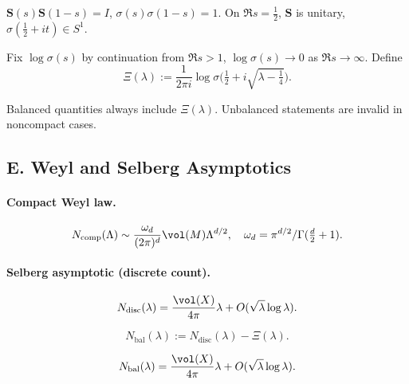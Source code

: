 \begin{lemma}
\label{lem:unitarity-part1}
$\mathbf S(s)\mathbf S(1-s)=I$, $\sigma(s)\sigma(1-s)=1$. On $\Re s=\tfrac12$, $\mathbf S$ is unitary, $\sigma(\tfrac12+it)\in S^1$.
\end{lemma}

\begin{definition}
\label{def:scattering-phase-part1}
Fix $\log\sigma(s)$ by continuation from $\Re s>1$, $\log\sigma(s)\to0$ as $\Re s\to\infty$. Define
\[
  \Xi(\lambda) := \frac{1}{2\pi i}\log \sigma\!\Big(\tfrac12+i\sqrt{\lambda-\tfrac14}\Big).
\]
\end{definition}

\begin{remark}
\label{rem:balance-part1}
Balanced quantities always include $\Xi(\lambda)$. Unbalanced statements are invalid in noncompact cases.
\end{remark}


\subsection*{E. Weyl and Selberg Asymptotics}
\label{subsec:weyl-selberg-part1}

\paragraph{Compact Weyl law.}
\[
  N_{\mathrm{comp}}(\Lambda)\sim \frac{\omega_d}{(2\pi)^d}\vol(M)\Lambda^{d/2},\quad \omega_d=\pi^{d/2}/\Gamma(\tfrac d2+1).
\]

\paragraph{Selberg asymptotic (discrete count).}
\[
  N_{\mathrm{disc}}(\lambda)=\frac{\vol(X)}{4\pi}\lambda + O(\sqrt{\lambda}\log\lambda).
\]

\begin{definition}
\label{def:balanced-count-part1}
\[
  N_{\mathrm{bal}}(\lambda):= N_{\mathrm{disc}}(\lambda)-\Xi(\lambda).
\]
\end{definition}

\begin{theorem}
\label{thm:balanced-selberg-part1}
\[
  N_{\mathrm{bal}}(\lambda)=\frac{\vol(X)}{4\pi}\lambda + O(\sqrt{\lambda}\log\lambda).
\]
\end{theorem}

